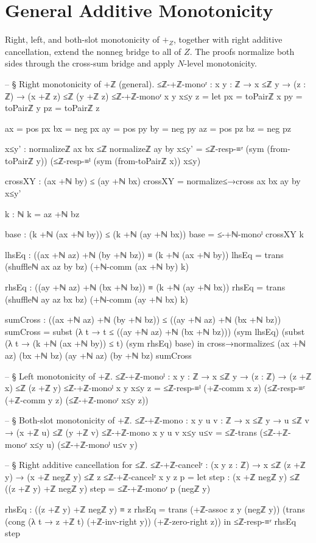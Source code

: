 \documentclass[11pt,a4paper]{book}
\def\mathbb#1{#1}%
\begin{document}
\section{General Additive Monotonicity}

Right, left, and both-slot monotonicity of $+_{\mathbb{Z}}$, together with right additive cancellation, extend the nonneg bridge to all of $\mathbb{Z}$.
The proofs normalize both sides through the cross-sum bridge and apply $\mathbb{N}$-level monotonicity.

\begin{code}
-- § Right monotonicity of +ℤ (general).
≤ℤ-+ℤ-monoʳ : {x y : ℤ} → x ≤ℤ y → (z : ℤ) → (x +ℤ z) ≤ℤ (y +ℤ z)
≤ℤ-+ℤ-monoʳ {x} {y} x≤y z =
  let
    px = toPairℤ x
    py = toPairℤ y
    pz = toPairℤ z

    ax = pos px
    bx = neg px
    ay = pos py
    by = neg py
    az = pos pz
    bz = neg pz

    x≤y' : normalizeℤ ax bx ≤ℤ normalizeℤ ay by
    x≤y' =
      ≤ℤ-resp-≡ʳ (sym (from-toPairℤ y))
        (≤ℤ-resp-≡ˡ (sym (from-toPairℤ x)) x≤y)

    crossXY : (ax +ℕ by) ≤ (ay +ℕ bx)
    crossXY = normalize≤→cross ax bx ay by x≤y'

    k : ℕ
    k = az +ℕ bz

    base : (k +ℕ (ax +ℕ by)) ≤ (k +ℕ (ay +ℕ bx))
    base = ≤-+ℕ-monoˡ crossXY k

    lhsEq : ((ax +ℕ az) +ℕ (by +ℕ bz)) ≡ (k +ℕ (ax +ℕ by))
    lhsEq =
      trans
        (shuffleℕ ax az by bz)
        (+ℕ-comm (ax +ℕ by) k)

    rhsEq : ((ay +ℕ az) +ℕ (bx +ℕ bz)) ≡ (k +ℕ (ay +ℕ bx))
    rhsEq =
      trans
        (shuffleℕ ay az bx bz)
        (+ℕ-comm (ay +ℕ bx) k)

    sumCross : ((ax +ℕ az) +ℕ (by +ℕ bz)) ≤ ((ay +ℕ az) +ℕ (bx +ℕ bz))
    sumCross =
      subst (λ t → t ≤ ((ay +ℕ az) +ℕ (bx +ℕ bz))) (sym lhsEq)
        (subst (λ t → (k +ℕ (ax +ℕ by)) ≤ t) (sym rhsEq) base)
  in
  cross→normalize≤ (ax +ℕ az) (bx +ℕ bz) (ay +ℕ az) (by +ℕ bz) sumCross

-- § Left monotonicity of +ℤ.
≤ℤ-+ℤ-monoˡ : {x y : ℤ} → x ≤ℤ y → (z : ℤ) → (z +ℤ x) ≤ℤ (z +ℤ y)
≤ℤ-+ℤ-monoˡ {x} {y} x≤y z =
  ≤ℤ-resp-≡ˡ (+ℤ-comm x z)
    (≤ℤ-resp-≡ʳ (+ℤ-comm y z)
      (≤ℤ-+ℤ-monoʳ x≤y z))

-- § Both-slot monotonicity of +ℤ.
≤ℤ-+ℤ-mono : {x y u v : ℤ} → x ≤ℤ y → u ≤ℤ v → (x +ℤ u) ≤ℤ (y +ℤ v)
≤ℤ-+ℤ-mono {x} {y} {u} {v} x≤y u≤v =
  ≤ℤ-trans (≤ℤ-+ℤ-monoʳ x≤y u) (≤ℤ-+ℤ-monoˡ u≤v y)

-- § Right additive cancellation for ≤ℤ.
≤ℤ-+ℤ-cancelʳ : (x y z : ℤ) → x ≤ℤ (z +ℤ y) → (x +ℤ negℤ y) ≤ℤ z
≤ℤ-+ℤ-cancelʳ x y z p =
  let
    step : (x +ℤ negℤ y) ≤ℤ ((z +ℤ y) +ℤ negℤ y)
    step = ≤ℤ-+ℤ-monoʳ p (negℤ y)

    rhsEq : ((z +ℤ y) +ℤ negℤ y) ≡ z
    rhsEq =
      trans
        (+ℤ-assoc z y (negℤ y))
        (trans
          (cong (λ t → z +ℤ t) (+ℤ-inv-right y))
          (+ℤ-zero-right z))
  in
  ≤ℤ-resp-≡ʳ rhsEq step
\end{code}
\end{document}
